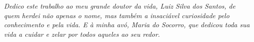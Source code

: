\begin{titlepage}
\thispagestyle{empty}
\vspace*{\fill}

\begin{center}
  \itshape
  Dedico este trabalho ao meu grande doutor da vida, Luiz Silva dos Santos, de quem herdei não apenas o nome, mas também a insaciável curiosidade pelo conhecimento e pela vida. E à minha avó, Maria do Socorro, que dedicou toda sua vida a cuidar e zelar por todos aqueles ao seu redor.
\end{center}

\vspace*{3cm}
\end{titlepage}